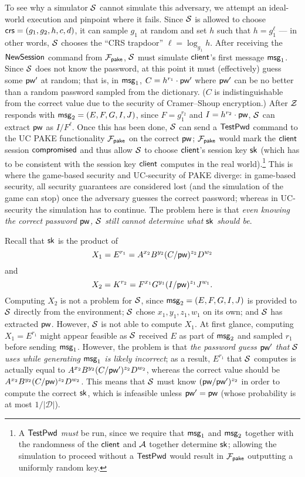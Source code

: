 To see why a simulator $\mathcal{S}$ cannot simulate this adversary, we attempt an ideal-world execution and pinpoint where it fails. Since $\mathcal{S}$ is allowed to choose $\mathsf{crs}=(g_1, g_2, h, c, d)$, it can sample $g_1$ at random and set $h$ such that $h=g_1^{\ell}$ --- in other words, $\mathcal{S}$ chooses the ``CRS trapdoor'' $\ell = \log_{g_1} h$. After receiving the $\mathsf{NewSession}$ command from $\mathcal{F}_{\mathsf{pake}}$, $\mathcal{S}$ must simulate $\mathsf{client}$'s first message $\mathsf{msg}_{1}$. Since $\mathcal{S}$ does not know the password, at this point it must (effectively) guess some $\mathsf{pw}'$ at random; that is, in $\mathsf{msg}_{1}$, $C=h^{r_1}\cdot\mathsf{pw}'$ where $\mathsf{pw}'$ can be no better than a random password sampled from the dictionary. ($C$ is indistinguishable from the correct value due to the security of Cramer--Shoup encryption.) After $\mathcal{Z}$ responds with $\mathsf{msg}_{2} = (E,F,G,I,J)$, since $F = g_1^{r_2}$ and $I = h^{r_2} \cdot \mathsf{pw}$, $\mathcal{S}$ can extract $\mathsf{pw}$ as $I/F^\ell$. Once this has been done, $\mathcal{S}$ can send a $\mathsf{TestPwd}$ command to the UC PAKE functionality $\mathcal{F}_{\mathsf{pake}}$ on the correct $\mathsf{pw}$; $\mathcal{F}_{\mathsf{pake}}$ would mark the $\mathsf{client}$ session $\mathsf{compromised}$ and thus allow $\mathcal{S}$ to choose $\mathsf{client}$'s session key $\mathsf{sk}$ (which has to be consistent with the session key $\mathsf{client}$ computes in the real world).\footnote{A $\mathsf{TestPwd}$ \emph{must} be run, since we require that $\mathsf{msg}_{1}$ and $\mathsf{msg}_{2}$ together with the randomness of the $\mathsf{client}$ and $\mathcal{A}$ together determine $\mathsf{sk}$; allowing the simulation to proceed without a $\mathsf{TestPwd}$ would result in $\mathcal{F}_{\mathsf{pake}}$ outputting a uniformly random key.} This is where the game-based security and UC-security of PAKE diverge: in game-based security, all security guarantees are considered lost (and the simulation of the game can stop) once the adversary guesses the correct password; whereas in UC-security the simulation has to continue. The problem here is that \emph{even knowing the correct password $\mathsf{pw}$, $\mathcal{S}$ still cannot determine what $\mathsf{sk}$ should be}.

Recall that $\mathsf{sk}$ is the product of
\[
X_1 = E^{r_1} = A^{x_2}B^{y_2}(C/\mathsf{pw})^{z_2}D^{w_2}
\]
and
\[
X_2 = K^{r_2} = F^{x_1}G^{y_1}(I/\mathsf{pw})^{z_1}J^{w_1}.
\]
Computing $X_2$ is not a problem for $\mathcal{S}$, since $\mathsf{msg}_{2} = (E,F,G,I,J)$ is provided to $\mathcal{S}$ directly from the environment; $\mathcal{S}$ chose $x_1, y_1, z_1, w_1$ on its own; and $\mathcal{S}$ has extracted $\mathsf{pw}$. However, $\mathcal{S}$ is not able to compute $X_1$. At first glance, computing $X_1 = E^{r_1}$ might appear feasible as $\mathcal{S}$ received $E$ as part of $\mathsf{msg}_{2}$ and sampled $r_1$ before sending $\mathsf{msg}_{1}$. However, the problem is that \emph{the password guess $\mathsf{pw}'$ that $\mathcal{S}$ uses while generating $\mathsf{msg}_{1}$ is likely incorrect}; as a result, $E^{r_1}$ that $\mathcal{S}$ computes is actually equal to $A^{x_2}B^{y_2}(C/\mathsf{pw}')^{z_2}D^{w_2}$, whereas the correct value should be $A^{x_2}B^{y_2}(C/\mathsf{pw})^{z_2}D^{w_2}$. This means that $\mathcal{S}$ must know $(\mathsf{pw}/\mathsf{pw}')^{z_2}$ in order to compute the correct $\mathsf{sk}$, which is infeasible unless $\mathsf{pw}'=\mathsf{pw}$ (whose probability is at most $1/\mathcal{|D|}$).

